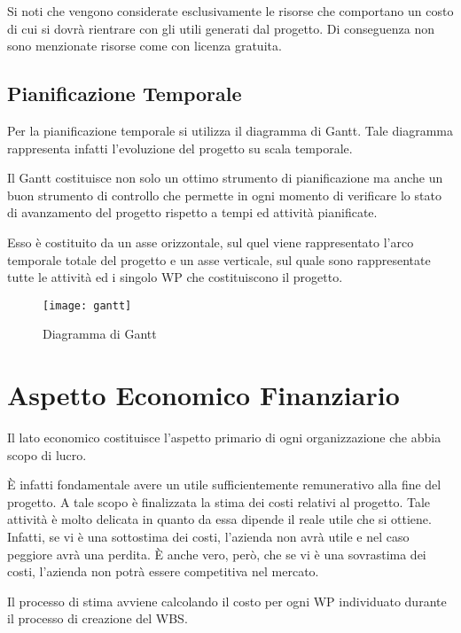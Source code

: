 Si noti che vengono considerate esclusivamente le risorse che comportano un costo di cui si dovrà rientrare con gli utili generati dal progetto. Di conseguenza non sono menzionate risorse come \sw con licenza gratuita.

\subsection{Pianificazione Temporale}
Per la pianificazione temporale si utilizza il diagramma di Gantt. Tale diagramma rappresenta infatti l'evoluzione del progetto su scala temporale.

Il Gantt costituisce non solo un ottimo strumento di pianificazione ma anche un buon strumento di controllo che permette in ogni momento di verificare lo stato di avanzamento del progetto rispetto a tempi ed attività pianificate.

Esso è costituito da un asse orizzontale, sul quel viene rappresentato l'arco temporale totale del progetto e un asse verticale, sul quale sono rappresentate tutte le attività ed i singolo WP che costituiscono il progetto.

\begin{figure}[!h]
  \texttt{[image: gantt]}	
  	\label{fig:gantt}
	\caption{Diagramma di Gantt}
\end{figure}

\clearpage

\section{Aspetto Economico Finanziario}
Il lato economico costituisce l'aspetto primario di ogni organizzazione che abbia scopo di lucro.

È infatti fondamentale avere un utile sufficientemente remunerativo alla fine del progetto. A tale scopo è finalizzata la stima dei costi relativi al progetto. Tale attività è molto delicata in quanto da essa dipende il reale utile che si ottiene. Infatti, se vi è una sottostima dei costi, l'azienda non avrà utile e nel caso peggiore avrà una perdita. È anche vero, però, che se vi è una sovrastima dei costi, l'azienda non potrà essere competitiva nel mercato.

Il processo di stima avviene calcolando il costo per ogni WP individuato durante il processo di creazione del WBS.

